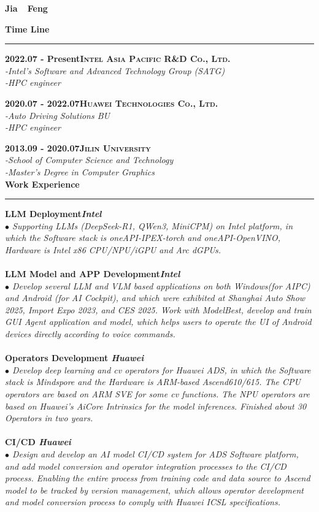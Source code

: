\documentclass[a4paper,12pt,final]{memoir}
\newcommand{\myThemeColor}{RoyalBlue}
\newcommand{\SmallSep}{\vspace{0.9em}}
\newcommand{\CVSection}[1]
	{\Large\textbf{#1}\par
	\vspace{0.2cm}\normalsize\normalfont}
\newcommand{\CVItem}[1]
	{\textbf{\color{\myThemeColor} #1}}
\begin{document}
\Huge\bfseries {\color{\myThemeColor} Jia~~Feng}\\
\normalsize\normalfont

\CVSection{Time Line}
\hrule
\SmallSep

\CVItem{2022.07 - Present\hfill\textsc{Intel Asia Pacific R\&D Co., Ltd.}}\\
\textit{-Intel's Software and Advanced Technology Group (SATG)}\\
\textit{-HPC engineer}

\CVItem{2020.07 - 2022.07\hfill\textsc{Huawei Technologies Co., Ltd.}}\\
\textit{-Auto Driving Solutions BU}\\
\textit{-HPC engineer}

\CVItem{2013.09 - 2020.07\hfill\textsc{Jilin University}}\\
\textit{-School of Computer Science and Technology}\\
\textit{-Master's Degree in Computer Graphics}
\\

\CVSection{Work Experience}
\hrule
\SmallSep
\CVItem{LLM Deployment\hfill\emph{Intel}}\\
\textit{$\bullet$ Supporting LLMs (DeepSeek-R1, QWen3, MiniCPM) on Intel platform, in which the Software stack is oneAPI-IPEX-torch and oneAPI-OpenVINO, Hardware is Intel x86 CPU/NPU/iGPU and Arc dGPUs. }
\\
\\
\CVItem{LLM Model and APP Development\hfill\emph{Intel}}\\
\textit{$\bullet$ 
Develop several LLM and VLM based applications on both Windows(for AIPC) and Android (for AI Cockpit), and which were exhibited at Shanghai Auto Show 2025, Import Expo 2023, and CES 2025. Work with ModelBest, develop and train GUI Agent application and model, which helps users to operate the UI of Android devices directly according to voice commands.} 
\\
\\
\CVItem{Operators Development \hfill\emph{Huawei}}\\
\textit{$\bullet$ Develop deep learning and cv operators for Huawei ADS, in which the Software stack is Mindspore and the Hardware is ARM-based Ascend610/615. The CPU operators are based on ARM SVE for some cv functions. The NPU operators are based on Huawei’s AiCore Intrinsics for the model inferences. Finished about 30 Operators in two years.}
\\
\\
\CVItem{CI/CD \hfill\emph{Huawei}}\\
\textit{$\bullet$ 
Design and develop an AI model CI/CD system for ADS Software platform, and add model conversion and operator integration processes to the CI/CD process. Enabling the entire process from training code and data source to Ascend model to be tracked by version management, which allows operator development and model conversion process to comply with Huawei ICSL specifications. }
\\
\\
\end{document}
